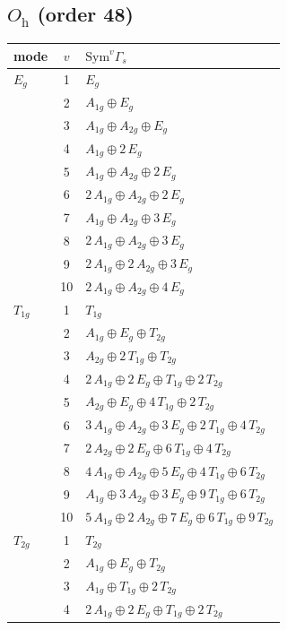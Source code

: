 \documentclass[11pt]{article}
\begin{document}
\subsection*{$O_{\mathrm h}$ \quad (order 48)}
\begin{longtable}{l c p{}}
\hline mode & $v$ & $\mathrm{Sym}^v\Gamma_s$\\ \hline\endhead
$E_{g}$ & 1 & $E_{g}$\\
 & 2 & $A_{1g}\oplus E_{g}$\\
 & 3 & $A_{1g}\oplus A_{2g}\oplus E_{g}$\\
 & 4 & $A_{1g}\oplus 2\,E_{g}$\\
 & 5 & $A_{1g}\oplus A_{2g}\oplus 2\,E_{g}$\\
 & 6 & $2\,A_{1g}\oplus A_{2g}\oplus 2\,E_{g}$\\
 & 7 & $A_{1g}\oplus A_{2g}\oplus 3\,E_{g}$\\
 & 8 & $2\,A_{1g}\oplus A_{2g}\oplus 3\,E_{g}$\\
 & 9 & $2\,A_{1g}\oplus 2\,A_{2g}\oplus 3\,E_{g}$\\
 & 10 & $2\,A_{1g}\oplus A_{2g}\oplus 4\,E_{g}$\\
\hline
$T_{1g}$ & 1 & $T_{1g}$\\
 & 2 & $A_{1g}\oplus E_{g}\oplus T_{2g}$\\
 & 3 & $A_{2g}\oplus 2\,T_{1g}\oplus T_{2g}$\\
 & 4 & $2\,A_{1g}\oplus 2\,E_{g}\oplus T_{1g}\oplus 2\,T_{2g}$\\
 & 5 & $A_{2g}\oplus E_{g}\oplus 4\,T_{1g}\oplus 2\,T_{2g}$\\
 & 6 & $3\,A_{1g}\oplus A_{2g}\oplus 3\,E_{g}\oplus 2\,T_{1g}\oplus 4\,T_{2g}$\\
 & 7 & $2\,A_{2g}\oplus 2\,E_{g}\oplus 6\,T_{1g}\oplus 4\,T_{2g}$\\
 & 8 & $4\,A_{1g}\oplus A_{2g}\oplus 5\,E_{g}\oplus 4\,T_{1g}\oplus 6\,T_{2g}$\\
 & 9 & $A_{1g}\oplus 3\,A_{2g}\oplus 3\,E_{g}\oplus 9\,T_{1g}\oplus 6\,T_{2g}$\\
 & 10 & $5\,A_{1g}\oplus 2\,A_{2g}\oplus 7\,E_{g}\oplus 6\,T_{1g}\oplus 9\,T_{2g}$\\
\hline
$T_{2g}$ & 1 & $T_{2g}$\\
 & 2 & $A_{1g}\oplus E_{g}\oplus T_{2g}$\\
 & 3 & $A_{1g}\oplus T_{1g}\oplus 2\,T_{2g}$\\
 & 4 & $2\,A_{1g}\oplus 2\,E_{g}\oplus T_{1g}\oplus 2\,T_{2g}$\\

\end{longtable}
\end{document}
